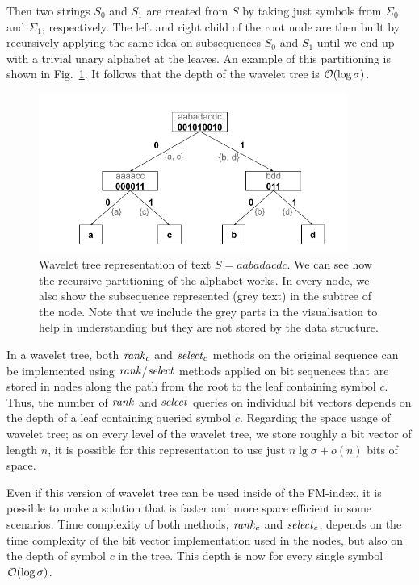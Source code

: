 Then two strings $S_0$ and $S_1$ are created from $S$ by taking just symbols
from $\Sigma_0$ and $\Sigma_1$, respectively. The left and right child of the root node
are then built by recursively applying the same idea on subsequences $S_0$ and $S_1$ until
we end up with a trivial unary alphabet at the leaves. An example of this partitioning is
shown in Fig.~\ref{obr:WaveletTreeExample}. It follows that the depth of the wavelet tree
is $\mathcal{O}(\log \sigma)$.
\begin{figure}
	\centerline{
		\includegraphics[width=0.9\textwidth, height=0.3\textheight]{images/wavelet_tree}
	}
	\caption[TODO]{Wavelet tree representation of text $S=\mathit{aabadacdc}$. We can see how
	the recursive partitioning of the alphabet works. In every node, we also show the
	subsequence represented (grey text) in the subtree of the node. Note that we include the
	grey parts in the visualisation to help in understanding but they are not stored by
	the data structure.
	}
	\label{obr:WaveletTreeExample}
\end{figure}

In a wavelet tree, both $\mathit{rank}_c$ and $\mathit{select}_c$ methods on the original sequence can
be implemented using $\mathit{rank}$/$\mathit{select}$ methods applied on bit sequences that are stored
in nodes along the path from the root to the leaf containing symbol $c$. Thus, the
number of $\mathit{rank}$ and $\mathit{select}$ queries on individual bit vectors depends on the depth of
a leaf containing queried symbol $c$. Regarding the space usage of wavelet tree; as on every
level of the wavelet tree, we store roughly a bit vector of length $n$, it is possible
for this representation to use just $n\lg \sigma+o(n)$ bits of space.

Even if this version of wavelet tree can be used inside of the FM-index, it is possible to
make a solution that is faster and more space efficient in some scenarios. Time complexity
of both methods, $\mathit{rank}_c$ and $\mathit{select}_c$, depends on the time complexity of the bit vector
implementation used in the nodes, but also on the depth of symbol $c$ in the tree. This depth
is now for every single symbol $\mathcal{O}(\log \sigma)$.

